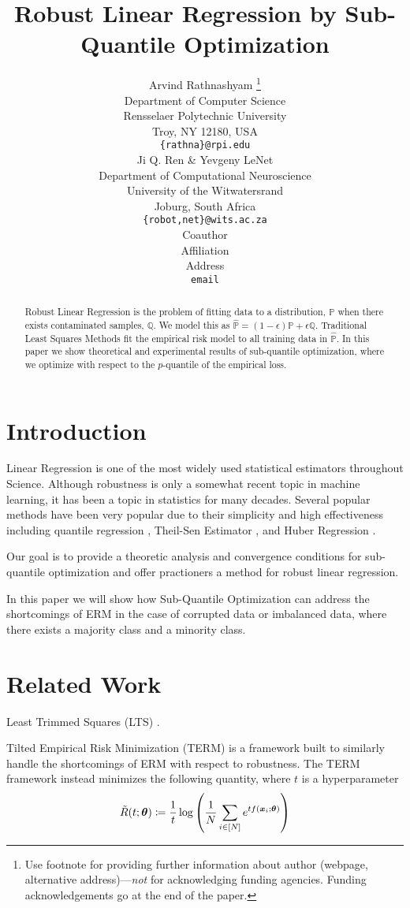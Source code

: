\documentclass{article} %
\title{Robust Linear Regression by Sub-Quantile Optimization}
\author{Arvind Rathnashyam \thanks{ Use footnote for providing further information
		about author (webpage, alternative address)---\emph{not} for acknowledging
		funding agencies.  Funding acknowledgements go at the end of the paper.} \\
	Department of Computer Science\\
	Rensselaer Polytechnic University\\
	Troy, NY 12180, USA \\
	\texttt{\{rathna\}@rpi.edu} \\
	\And
	Ji Q. Ren \& Yevgeny LeNet \\
	Department of Computational Neuroscience \\
	University of the Witwatersrand \\
	Joburg, South Africa \\
	\texttt{\{robot,net\}@wits.ac.za} \\
	\AND
	Coauthor \\
	Affiliation \\
	Address \\
	\texttt{email}
}
\begin{document}
	
	
	\maketitle
	
	\begin{abstract}
		Robust Linear Regression is the problem of fitting data to a distribution, $\displaystyle \mathbb{P}$ when there exists contaminated samples, $\displaystyle \mathbb{Q}$. We model this as $\displaystyle \hat{\mathbb{P}} = (1-\epsilon)\mathbb{P} + \epsilon\mathbb{Q}$. Traditional Least Squares Methods fit the empirical risk model to all training data in $\displaystyle \hat{\mathbb{P}}$. In this paper we show theoretical and experimental results of sub-quantile optimization, where we optimize with respect to the $p$-quantile of the empirical loss.
	\end{abstract}
	
	\section{Introduction}
	Linear Regression is one of the most widely used statistical estimators throughout Science. Although robustness is only a somewhat recent topic in machine learning, it has been a topic in statistics for many decades. Several popular methods have been very popular due to their simplicity and high effectiveness including quantile regression \cite{quantile-regression}, Theil-Sen Estimator \cite{thiel-sen}, and Huber Regression \cite{Huber2009}.
	
	Our goal is to provide a theoretic analysis and convergence conditions for sub-quantile optimization and offer practioners a method for robust linear regression.
	
	In this paper we will show how Sub-Quantile Optimization can address the shortcomings of ERM in the case of corrupted data or imbalanced data, where there exists a majority class and a minority class.
	
		
	\section{Related Work}
	Least Trimmed Squares (LTS) \cite{LTS}.
	
	Tilted Empirical Risk Minimization (TERM) \cite{li2020tilted} is a framework built to similarly handle the shortcomings of ERM with respect to robustness. The TERM framework instead minimizes the following quantity, where $t$ is a hyperparameter
	\begin{equation}
		\tilde{R}(t;{\bm{\theta}}) \coloneqq \frac{1}{t} \log\left(\frac{1}{N}\sum_{i \in \left[N\right]}e^{tf({\bm{x}}_i;{\bm{\theta}})} \right)
	\end{equation}
	
\end{document}
